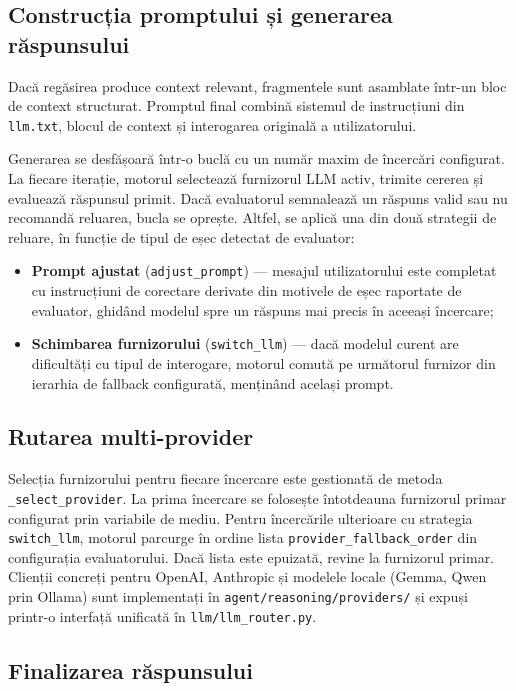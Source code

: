 \documentclass[12pt, a4paper, oneside, romanian]{teza-upb}
\begin{document}
\subsection{Construcția promptului și generarea răspunsului}

Dacă regăsirea produce context relevant, fragmentele sunt asamblate într-un bloc de context structurat. Promptul final combină sistemul de instrucțiuni din \texttt{llm.txt}, blocul de context și interogarea originală a utilizatorului.

Generarea se desfășoară într-o buclă cu un număr maxim de încercări configurat. La fiecare iterație, motorul selectează furnizorul LLM activ, trimite cererea și evaluează răspunsul primit. Dacă evaluatorul semnalează un răspuns valid sau nu recomandă reluarea, bucla se oprește. Altfel, se aplică una din două strategii de reluare, în funcție de tipul de eșec detectat de evaluator:

\begin{itemize}
    \item \textbf{Prompt ajustat} (\texttt{adjust\_prompt}) — mesajul utilizatorului este completat cu instrucțiuni de corectare derivate din motivele de eșec raportate de evaluator, ghidând modelul spre un răspuns mai precis în aceeași încercare;
    \item \textbf{Schimbarea furnizorului} (\texttt{switch\_llm}) — dacă modelul curent are dificultăți cu tipul de interogare, motorul comută pe următorul furnizor din ierarhia de fallback configurată, menținând același prompt.
\end{itemize}

\subsection{Rutarea multi-provider}

Selecția furnizorului pentru fiecare încercare este gestionată de metoda \texttt{\_select\_provider}. La prima încercare se folosește întotdeauna furnizorul primar configurat prin variabile de mediu. Pentru încercările ulterioare cu strategia \texttt{switch\_llm}, motorul parcurge în ordine lista \texttt{provider\_fallback\_order} din configurația evaluatorului. Dacă lista este epuizată, revine la furnizorul primar. Clienții concreți pentru OpenAI, Anthropic și modelele locale (Gemma, Qwen prin Ollama) sunt implementați în \texttt{agent/reasoning/providers/} și expuși printr-o interfață unificată în \texttt{llm/llm\_router.py}.

\subsection{Finalizarea răspunsului}
\end{document}
